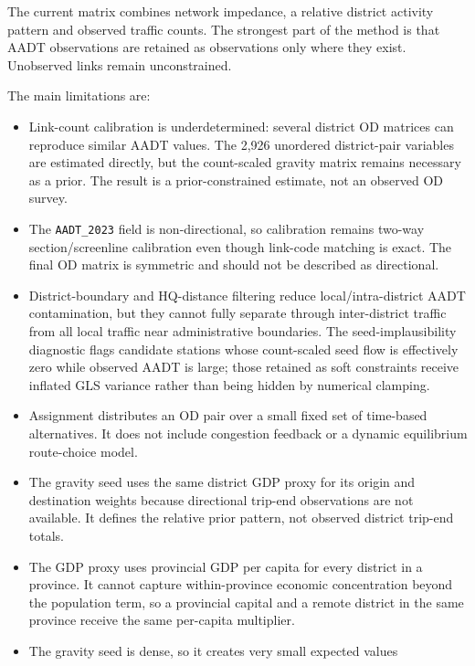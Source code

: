 \documentclass[11pt,a4paper]{article}
\begin{document}
The current matrix combines network impedance, a relative district activity
pattern and observed traffic counts. The strongest part of the method is that
AADT observations are retained as observations only where they exist.
Unobserved links remain unconstrained.

The main limitations are:

\begin{itemize}
    \item Link-count calibration is underdetermined: several district OD
    matrices can reproduce similar AADT values. The 2,926 unordered
    district-pair variables are estimated directly, but the count-scaled
    gravity matrix remains necessary as a prior. The result is a
    prior-constrained estimate, not an observed OD survey.
    \item The \texttt{AADT\_2023} field is non-directional, so calibration
    remains two-way section/screenline calibration even though link-code
    matching is exact. The final OD matrix is symmetric and should not be
    described as directional.
    \item District-boundary and HQ-distance filtering reduce local/intra-district
    AADT contamination, but they cannot fully separate through inter-district
    traffic from all local traffic near administrative boundaries. The
    seed-implausibility diagnostic flags candidate stations whose count-scaled
    seed flow is effectively zero while observed AADT is large; those retained
    as soft constraints receive inflated GLS variance rather than being hidden
    by numerical clamping.
    \item Assignment distributes an OD pair over a small fixed set of
    time-based alternatives. It does not include congestion feedback or a
    dynamic equilibrium route-choice model.
    \item The gravity seed uses the same district GDP proxy for its origin and
    destination weights because directional trip-end observations are not
    available. It defines the relative prior pattern, not observed district
    trip-end totals.
    \item The GDP proxy uses provincial GDP per capita for every district in a
    province. It cannot capture within-province economic concentration beyond
    the population term, so a provincial capital and a remote district in the
    same province receive the same per-capita multiplier.
    \item The gravity seed is dense, so it creates very small expected values

\end{itemize}
\end{document}
